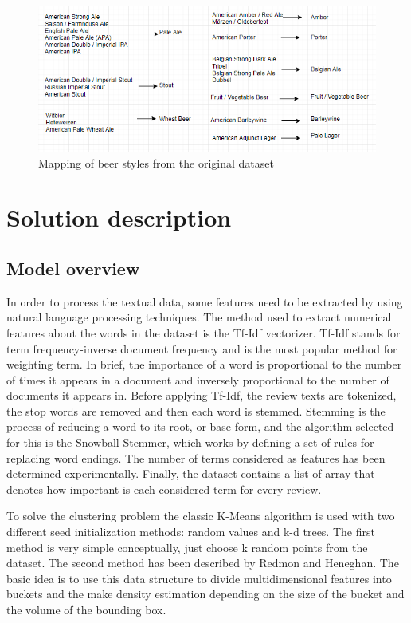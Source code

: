 \documentclass[12pt]{article}
\begin{document}
	\begin{figure}
		\includegraphics[width=\linewidth]{resources/MappingDiagram.png}
		\caption{Mapping of beer styles from the original dataset}
		\label{fig:styleMapping}
	\end{figure}

	\section{Solution description}
	\subsection{Model overview}
	In order to process the textual data, some features need to be extracted by using natural language processing techniques. The method used to extract numerical features about the words in the dataset is the Tf-Idf vectorizer. Tf-Idf\cite{TfIdfBook} stands for term frequency-inverse document frequency and is the most popular method for weighting term. In brief, the importance of a word is proportional to the number of times it appears in a document and inversely proportional to the number of documents it appears in. Before applying Tf-Idf, the review texts are tokenized, the stop words are removed and then each word is stemmed. Stemming is the process of reducing a word to its root, or base form, and the algorithm selected for this is the Snowball Stemmer\cite{SnowballStemmer}, which works by defining a set of rules for replacing word endings. The number of terms considered as features has been determined experimentally. Finally, the dataset contains a list of array that denotes how important is each considered term for every review.
	
	To solve the clustering problem the classic K-Means algorithm is used with two different seed initialization methods: random values and k-d trees. The first method is very simple conceptually, just choose k random points from the dataset. The second method has been described by Redmon and Heneghan\cite{KdTreeKmeans}. The basic idea is to use this data structure to divide multidimensional features into buckets and the make density estimation depending on the size of the bucket and the volume of the bounding box.
	
\end{document}
